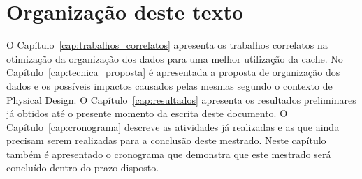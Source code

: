 %

\section{Organização deste texto}

O Capítulo~\ref{cap:trabalhos_correlatos} apresenta os trabalhos correlatos na otimização da organização dos dados para uma melhor utilização da cache.
No Capítulo~\ref{cap:tecnica_proposta} é apresentada a proposta de organização dos dados e os possíveis impactos causados pelas mesmas segundo o contexto de Physical Design.
O Capítulo~\ref{cap:resultados} apresenta os resultados preliminares já obtidos até o presente momento da escrita deste documento.
O Capítulo~\ref{cap:cronograma} descreve as atividades já realizadas e as que ainda precisam serem realizadas para a conclusão deste mestrado. Neste capítulo também é apresentado o cronograma que demonstra que este mestrado será concluído dentro do prazo disposto.
